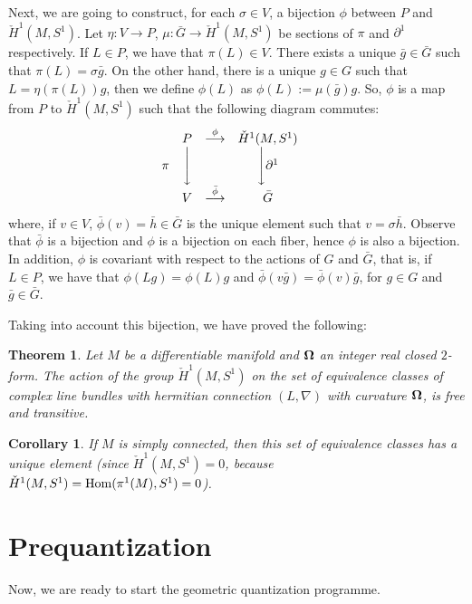 \documentclass[12pt]{article}
\newtheorem{teor}{Theorem}
\newtheorem{corol}{Corollary}
\def\mapping#1{\mathrel{\mathop{\longrightarrow}\limits^{#1}}}
\def\curv{{\bf \Omega}}
\begin{document}
Next, we are going to construct, for each $\sigma \in V$, a bijection
$\phi$
between $P$ and $\check H^1(M,S^1)$.
Let $\eta \colon V \to P$, $\mu \colon \bar G \to \check H^1(M,S^1)$
be sections of $\pi$ and $\partial^1$ respectively.
If $L \in P$, we have that $\pi (L) \in V$.
There exists a unique $\bar g \in \bar G$
such that $\pi (L) = \sigma \bar g$.
On the other hand, there is a unique $g \in G$
such that $L = \eta (\pi (L))g$,
then we define $\phi (L)$ as
$\phi (L) := \mu(\bar g)g$. So,
$\phi$ is a map from $P$ to $\check H^1(M,S^1)$
such that the following diagram commutes:
$$
\begin{array}{ccccc}
& P & \mapping{\phi} & \check H^1(M,S^1) &
\\
\pi & \Bigg\downarrow & & \Bigg\downarrow  \partial^1 &
\\
& V & \mapping{\bar \phi} & \bar G &
\end{array}
$$
where, if $v \in V$,
$\bar \phi (v) = \bar h \in \bar G$
is the unique element such that
$v = \sigma \bar h$.
Observe that $\bar \phi$ is a bijection and $\phi$ is a bijection
on each fiber, hence $\phi$ is also a bijection.
In addition, $\phi$ is covariant with respect to
the actions of $G$ and $\bar G$,
that is, if $L \in P$, we have that
$\phi (Lg) = \phi (L)g$ and
$\bar \phi (v \bar g) = \bar \phi (v) \bar g$,
for $g \in G$ and $\bar g \in \bar G$.

Taking into account this bijection, we have proved the following:

\begin{teor}
Let $M$ be a differentiable manifold
and $\curv$ an integer real closed $2$-form.
The action of the group $\check H^1(M,S^1)$
on the set of equivalence classes of complex line bundles
with hermitian connection $(L,\nabla )$
with curvature $\curv$, is free and transitive.
\end{teor}

\begin{corol}
If $M$ is simply connected,
then this set of equivalence classes has a unique element
(since $\check H^1(M,S^1) = 0$,
because
$\check H^1(M,S^1) = {\rm Hom} (\pi^1(M),S^1) = 0$).
\end{corol}




\section{Prequantization}
\protect\label{prequa}


Now, we are ready to start the geometric quantization programme.
\end{document}
